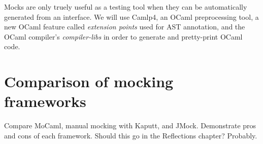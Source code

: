 Mocks are only truely useful as a testing tool when they can be
automatically generated from an interface. We will use Camlp4, an
OCaml preprocessing tool, a new OCaml feature called \textit{extension
  points} used for AST annotation, and the OCaml compiler's
\textit{compiler-libs} in order to generate and pretty-print OCaml
code.

\section{Comparison of mocking frameworks}
\label{application:comparison}

Compare MoCaml, manual mocking with Kaputt, and JMock. Demonstrate
pros and cons of each framework. Should this go in the Reflections
chapter? Probably.
